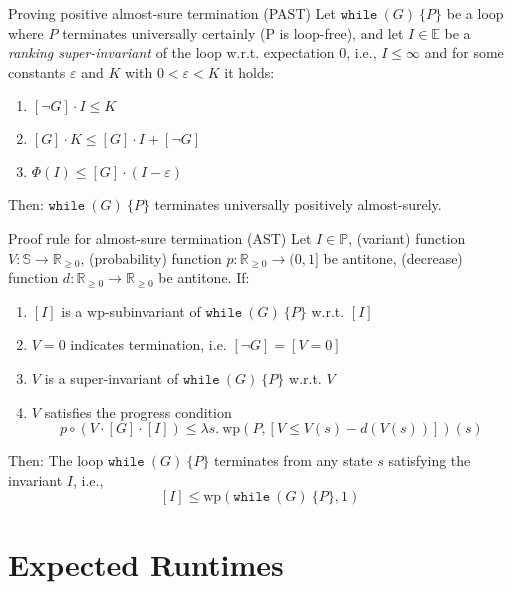 \documentclass[english]{panikzettel}
\newcommand{\stmtWhile}[2]{\texttt{while}~(#1)~\{ #2 \}}
\newcommand{\lam}[1]{\lambda #1.~}
\renewcommand{\wp}{\mathrm{wp}}
\newcommand{\rel}{\mathbb{R}}
\newcommand{\relg}{\rel_{\geq 0}}
\begin{document}
\begin{theo}{Proving positive almost-sure termination (PAST)}
    Let $\stmtWhile{G}{P}$ be a loop where $P$ terminates universally certainly (P is loop-free), and let $I \in \mathbb{E}$ be a \emph{ranking super-invariant} of the loop w.r.t. expectation $0$, i.e., $I \leq \infty$ and for some constants $\varepsilon$ and $K$ with $0 < \varepsilon < K$ it holds:
    \begin{enumerate}
        \item $[\neg G] \cdot I \leq K$
        \item $[G]\cdot K \leq [G] \cdot I + [\neg G]$
        \item $\Phi(I) \leq [G] \cdot (I - \varepsilon)$
    \end{enumerate}
    Then: $\stmtWhile{G}{P}$ terminates universally positively almost-surely.
\end{theo}

\begin{theo}{Proof rule for almost-sure termination (AST)}
    Let $I \in \mathbb{P}$, (variant) function $V: \mathbb{S} \to \relg$, (probability) function $p: \relg \to (0,1]$ be antitone, (decrease) function $d: \relg \to \relg$ be antitone. If:
    \begin{enumerate}
        \item $[I]$ is a $\wp$-subinvariant of $\stmtWhile{G}{P}$ w.r.t. $[I]$
        \item $V=0$ indicates termination, i.e. $[\neg G]=[V=0]$
        \item $V$ is a super-invariant of $\stmtWhile{G}{P}$ w.r.t. $V$
        \item $V$ satisfies the progress condition
            $$p \circ (V \cdot [G] \cdot [I]) \leq \lam{s}\wp(P,[V \leq V(s) -d(V(s))])(s)$$
    \end{enumerate}
    Then: The loop $\stmtWhile{G}{P}$ terminates from any state $s$ satisfying the invariant $I$, i.e.,
        $$[I] \leq \wp(\stmtWhile{G}{P},1)$$
\end{theo}

\section{Expected Runtimes}
\end{document}
